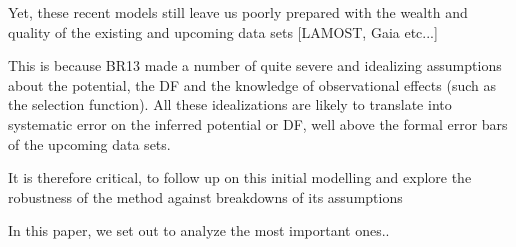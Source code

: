 Yet, these recent models still leave us poorly prepared with the wealth and quality of the existing and upcoming data sets [LAMOST, Gaia etc...]

This is because BR13 made a number of quite severe and idealizing assumptions about the potential, the DF and the knowledge of observational effects (such as the selection function). All these idealizations are likely to translate into systematic error on the inferred potential or DF, well above the formal error bars of the upcoming data sets.

It is therefore critical, to follow up on this initial modelling and explore the robustness of the method against breakdowns of its assumptions

In this paper, we set out to analyze the most important ones..






